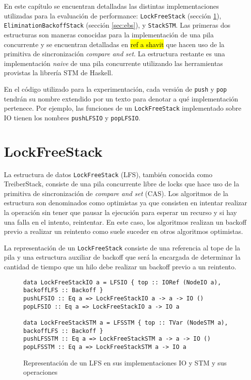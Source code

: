 En este capítulo se encuentran detalladas las distintas implementaciones utilizadas para la evaluación de performance: \texttt{LockFreeStack} (sección \ref{sec:lfs}), \texttt{EliminationBackoffStack} (sección \ref{sec:ebs}), y \texttt{StackSTM}. Las primeras dos estructuras son maneras conocidas para la implementación de una pila concurrente y se encuentran detalladas en \hl{ref a shavit} que hacen uso de la primitiva de sincronización \emph{compare and set}. La estructura restante es una implementación \emph{naive} de una pila concurrente utilizando las herramientas provistas la librería STM de Haskell.

En el código utilizado para la experimentación, cada versión de \texttt{push} y \texttt{pop} tendrán su nombre extendido por un texto para denotar a qué implementación pertenece. Por ejemplo, las funciones de un \texttt{LockFreeStack} implementado sobre IO tienen los nombres \texttt{pushLFSIO} y \texttt{popLFSIO}.

\clearpage
\section{LockFreeStack}\label{sec:lfs}
La estructura de datos \texttt{LockFreeStack} (LFS), también conocida como TreiberStack, consiste de una pila concurrente libre de locks que hace uso de la primitiva de sincronización de \emph{compare and set} (CAS). Los algoritmos de la estructura son denominados como optimistas ya que consisten en intentar realizar la operación sin tener que pausar la ejecución para esperar un recurso y si hay una falla en el intento, reintentar. En este caso, los algoritmos realizan un backoff previo a realizar un reintento como suele suceder en otros algoritmos optimistas.

La representación de un \texttt{LockFreeStack} consiste de una referencia al tope de la pila y una estructura auxiliar de backoff que será la encargada de determinar la cantidad de tiempo que un hilo debe realizar un backoff previo a un reintento.

\begin{figure}[H]
  \centering
  \begin{verbatim}
data LockFreeStackIO a = LFSIO { top :: IORef (NodeIO a), backoffLFS :: Backoff }
pushLFSIO :: Eq a => LockFreeStackIO a -> a -> IO ()
popLFSIO :: Eq a => LockFreeStackIO a -> IO a

data LockFreeStackSTM a = LFSSTM { top :: TVar (NodeSTM a), backoffLFS :: Backoff }
pushLFSSTM :: Eq a => LockFreeStackSTM a -> a -> IO ()
popLFSSTM :: Eq a => LockFreeStackSTM a -> IO a
  \end{verbatim}
  \caption{Representación de un LFS en sus implementaciones IO y STM y sus operaciones}
  \label{repLFS}
\end{figure}

